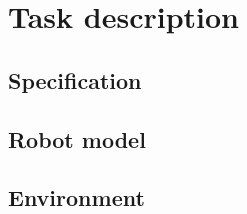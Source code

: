 \chapter{Task description}


\section{Specification}

\section{Robot model}

\section{Environment}

